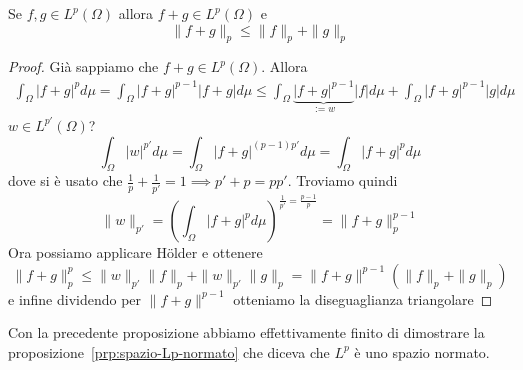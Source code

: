\begin{proposition}
    Se \(f, g \in L^{p}{(\Omega)}\) allora \(f + g \in L^{p}{(\Omega)}\) e
    \[
        \|f+g\|_p \le \|f\|_p + \|g\|_p
    \]
\end{proposition}
\begin{proof}
    Già sappiamo che \(f+g \in L^{p}{(\Omega)}\). Allora
    \begin{align*}
        \int_\Omega |f+g|^{p} d\mu = \int_\Omega |f+g|^{p-1} |f+g| d\mu \le
        \int_\Omega \underbrace{|f+g|^{p-1}}_{:= w} |f| d\mu + \int_\Omega |f+g|^{p-1} |g| d\mu
    \end{align*}
    \(w \in L^{p'}{(\Omega)}\)?
    \[
        \int_\Omega |w|^{p'} d\mu = \int_\Omega |f+g|^{(p-1)p'} d\mu = \int_\Omega |f+g|^{p} d\mu
    \]
    dove si è usato che \(\frac{1}{p} + \frac{1}{p'} = 1 \implies p' + p =
    pp'\). Troviamo quindi
    \[
        \|w\|_{p'} = {\left( \int_\Omega |f+g|^{p}d\mu \right)}^{\frac{1}{p'} =
        \frac{p-1}{p}} = \|f + g\|_p^{p-1}
    \]
    Ora possiamo applicare Hölder e ottenere
    \[
        \|f+g\|_p^{p} \le \|w\|_{p'} \|f\|_p + \|w\|_{p'} \|g\|_p =
        \|f+g\|^{p-1}{\left( \|f\|_p + \|g\|_p \right)} 
    \]
    e infine dividendo per \(\|f+g\|^{p-1}\) otteniamo la diseguaglianza
    triangolare
\end{proof}
Con la precedente proposizione abbiamo effettivamente finito di dimostrare la
proposizione~\ref{prp:spazio-Lp-normato} che diceva che \(L^{p}\) è uno spazio
normato.

